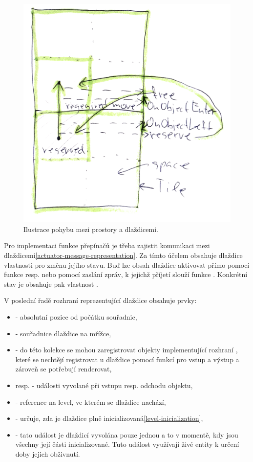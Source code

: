 \begin{figure}[H]\centering
\includegraphics[width=\textwidth]{./img/layout-reserve.png}
\caption{Ilustrace pohybu mezi prostory a dlaždicemi. }
\label{layout-reserve}
\end{figure}

Pro implementaci funkce přepínačů je třeba zajistit komunikaci mezi dlaždicemi\vref{actuator-message-representation}.
Za tímto účelem obsahuje dlaždice vlastnosti pro změnu jejího stavu. Buď lze obsah dlaždice aktivovat přímo
pomocí funkce  resp.  nebo pomocí zaslání zpráv, k jejichž
příjetí slouží funkce . Konkrétní stav je obsahuje pak vlastnost .


V poslední řadě rozhraní reprezentující dlaždice obsahuje prvky: 
\begin{itemize}
\item {} - absolutní pozice od počátku souřadnic,
\item {} - souřadnice dlaždice na mřížce, 
\item {} - do této kolekce se mohou zaregistrovat objekty implementující rozhraní , 
	které se nechtějí registrovat u dlaždice pomocí funkcí pro vstup a výstup a zároveň se potřebují renderovat, 
\item {} resp.  - události vyvolané při vstupu resp. odchodu objektu,
\item {} - reference na level, ve kterém se dlaždice nachází,
\item {} - určuje, zda je dlaždice plně inicializovaná\vref{level-inicialization},
\item {} - tato událost je dlaždicí vyvolána pouze jednou a to v momentě, kdy jsou všechny její části inicializované.
		Tuto událost využívají živé entity k určení doby jejich obživnutí.
\end{itemize}



